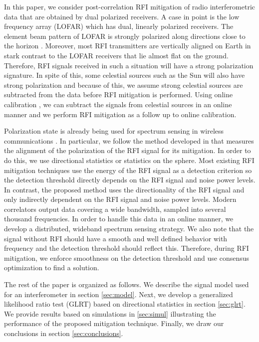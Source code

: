\documentclass[conference]{IEEEtran}
\begin{document}
In this paper, we consider post-correlation RFI mitigation of radio interferometric data that are obtained by dual polarized receivers. A case in point is the low frequency array (LOFAR) \cite{LOFAR} which has dual, linearly polarized receivers. The element beam pattern of LOFAR is strongly polarized along directions close to the horizon \cite{Bregman}. Moreover, most RFI transmitters are vertically aligned on Earth \cite{Bentum2008} in stark contrast to the LOFAR receivers that lie almost flat on the ground. Therefore, RFI signals received in such a situation will have a strong polarization  signature. In spite of this, some celestial sources such as the Sun will also have strong polarization and because of this, we assume strong celestial sources are subtracted from the data before RFI mitigation is performed. Using online calibration \cite{DSW2019,Y2020}, we can subtract the signals from celestial sources in an online manner and we perform RFI mitigation as a follow up to online calibration.

Polarization state is already being used for spectrum sensing in wireless communications \cite{Guo2013,guo2016review}. In particular, we follow the method developed in \cite{Guo2013} that measures the alignment of the polarization of the RFI signal for its mitigation. In order to do this, we use directional statistics \cite{Fisher1953,Stephens1967} or statistics on the sphere. Most existing RFI mitigation techniques use the energy of the RFI signal as a detection criterion so the detection threshold directly depends on the RFI signal and noise power levels. In contrast, the proposed method uses the directionality of the RFI signal and only indirectly dependent on the RFI signal and noise power levels. Modern correlators output data covering a wide bandwidth, sampled into several thousand frequencies. In order to handle this data in an online manner, we develop a distributed, wideband spectrum sensing \cite{Quan} strategy. We also note that the signal without RFI should have a smooth and well defined behavior with frequency and the detection threshold should reflect this. Therefore, during RFI mitigation, we enforce smoothness on the detection threshold and use consensus optimization \cite{boyd2011} to find a solution.

The rest of the paper is organized as follows. We describe the signal model used for an interferometer in section \ref{sec:model}. Next, we develop a generalized likelihood ratio test (GLRT) based on directional statistics in section \ref{sec:glrt}. We provide results based on simulations in \ref{sec:simul} illustrating the performance of the proposed mitigation technique. Finally, we draw our conclusions in section \ref{sec:conclusions}.
\end{document}
